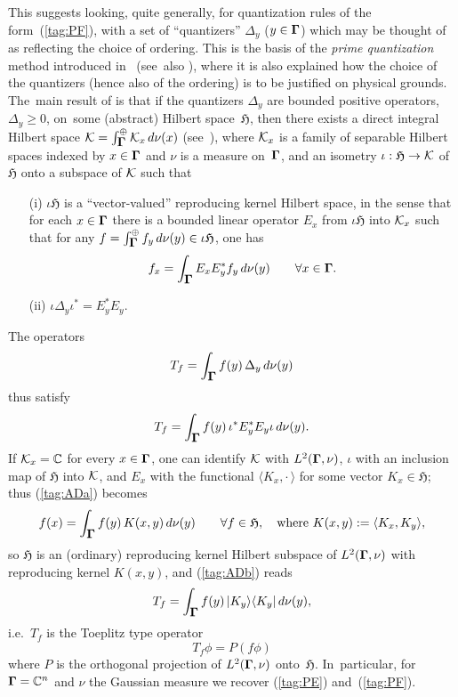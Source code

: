 \documentclass[12pt]{amsart}
\numberwithin{equation}{section}
\theoremstyle{remark}
\newcommand\spr[2]{\langle #1,#2\rangle}
\newcommand\into{\int_\Omg}
\newcommand\Omg{{\bigam}}   %
\newcommand\KK{{\Cal K}}
\newcommand\HH{\mathfrak H}
\newcommand{\CC}{\C}
\newcommand{\bigam}{\mbox{\boldmath $\Gamma$}}
\newcommand{\C}{\mathbb C}
\begin{document}
This suggests looking, quite generally, for quantization rules of the
form~(\ref{tag:PF}), with a set of ``quantizers'' $\Delta_y$ ($y\in\Omg$)
which may be thought of as reflecting the choice of ordering. This is the basis
of the {\it prime quantization\/} method introduced in~\cite{bib:AliD}
(see~also \cite{bib:Prugo}), where it is also explained how the choice of the
quantizers (hence also of the ordering) is to be justified on physical grounds.
The~main result of \cite{bib:AliD} is that if the quantizers $\Delta_y$ are
bounded positive operators, $\Delta_y\ge0$, on~some (abstract) Hilbert
space~$\HH$, then there exists a direct integral Hilbert space
$\KK=\into^\oplus \KK_x \,d\nu(x)$ (see~\cite{bib:BratteliR}), where $\KK_x$ is
a family of separable Hilbert spaces indexed by $x\in\Omg$ and $\nu$ is a
measure on~$\Omg$, and an isometry $\iota:\HH\to\KK$ of $\HH$ onto a subspace
of $\KK$ such that
\begin{enumerate}
\item[(i)] $\iota\HH$ is a ``vector-valued'' reproducing kernel Hilbert space,
in the sense that for each $x\in\Omg$ there is a bounded linear operator
$E_x$ from $\iota\HH$ into $\KK_x$ such that for any $f=\into^\oplus f_y\,d\nu
(y) \in\iota\HH$, one has
\begin{equation}  f_x = \into E_x E_y^* f_y \, d\nu(y) \qquad \forall
x\in\Omg. \label{tag:ADa} \end{equation}
\item[(ii)] $\iota\Delta_y\iota^* = E_y^* E_y$.  \end{enumerate}
The operators
$$ T_f = \into f(y) \,\Delta_y \,d\nu(y)  $$
thus satisfy
\begin{equation}  T_f = \into f(y) \,\iota^* E^*_y E_y\iota \,d\nu(y).
\label{tag:ADb}  \end{equation}
If $\KK_x=\CC$ for every $x\in\Omg$, one can identify $\KK$ with
$L^2(\Omg,\nu)$, $\iota$ with an inclusion map of $\HH$ into $\KK$, and $E_x$
with the functional $\spr{K_x}{\cdot\,}$ for some vector $K_x\in\HH$; thus
(\ref{tag:ADa}) becomes
$$ f(x) = \into f(y) \, K(x,y) \,d\nu(y) \qquad\forall f\in\HH,
\text{ where }K(x,y):=\spr{K_x}{K_y},  $$
so $\HH$ is an (ordinary) reproducing kernel Hilbert subspace of
$L^2(\Omg,\nu)$ with reproducing kernel $K(x,y)$, and (\ref{tag:ADb}) reads
$$ T_f = \into f(y) \, \vert K_y\rangle\langle K_y \vert \,d\nu(y),  $$
i.e.~$T_f$ is the Toeplitz type operator
$$ T_f \phi = P(f\phi)   $$
where $P$ is the orthogonal projection of $L^2(\Omg,\nu)$ onto~$\HH$.
In~particular, for $\Omg=\CC^n$ and $\nu$ the Gaussian measure we recover
(\ref{tag:PE}) and~(\ref{tag:PF}).
\end{document}

